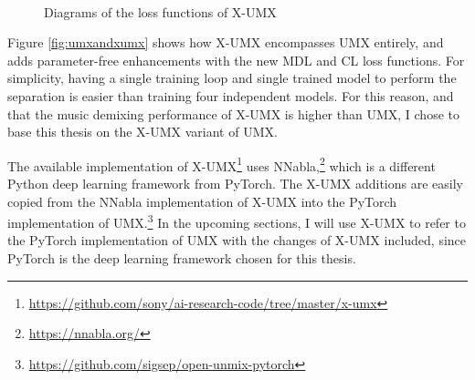 \documentclass[report.tex]{subfiles}
\begin{document}
\begin{figure}[ht]
	\centering
	\\
	\caption{Diagrams of the loss functions of X-UMX \parencite[2]{xumx}}
	\label{fig:xumxlosses}
\end{figure}

Figure \ref{fig:umxandxumx} shows how X-UMX encompasses UMX entirely, and adds parameter-free enhancements with the new MDL and CL loss functions. For simplicity, having a single training loop and single trained model to perform the separation is easier than training four independent models. For this reason, and that the music demixing performance of X-UMX is higher than UMX, I chose to base this thesis on the X-UMX variant of UMX.

The available implementation of X-UMX\footnote{\url{https://github.com/sony/ai-research-code/tree/master/x-umx}} uses NNabla,\footnote{\url{https://nnabla.org/}} which is a different Python deep learning framework from PyTorch. The X-UMX additions are easily copied from the NNabla implementation of X-UMX into the PyTorch implementation of UMX.\footnote{\url{https://github.com/sigsep/open-unmix-pytorch}} In the upcoming sections, I will use X-UMX to refer to the PyTorch implementation of UMX with the changes of X-UMX included, since PyTorch is the deep learning framework chosen for this thesis.
\end{document}
